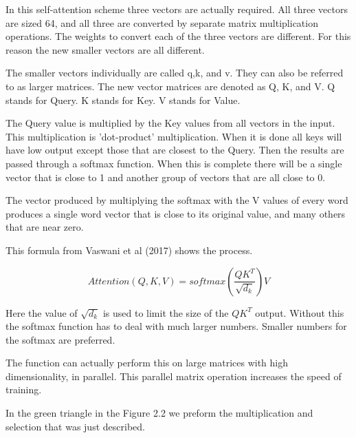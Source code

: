 In this self-attention scheme three vectors are actually required. All three vectors are sized 64, and all three are converted by separate matrix multiplication operations. The weights to convert each of the three vectors are different. For this reason the new smaller vectors are all different.

The smaller vectors individually are called q,k, and v. They can also be referred to as larger matrices. The new vector matrices are denoted as Q, K, and V. Q stands for Query. K stands for Key. V stands for Value. 

The Query value is multiplied by the Key values from all vectors in the input. This multiplication is 'dot-product' multiplication. When it is done all keys will have low output except those that are closest to the Query. Then the results are passed through a softmax function. When this is complete there will be a single vector that is close to 1 and another group of vectors that are all close to 0.

The vector produced by multiplying the softmax with the V values of every word produces a single word vector that is close to its original value, and many others that are near zero.

This formula from Vaswani et al (2017)\cite{Vaswani2017AttentionIA} 
shows the process.

$$
Attention(Q,K,V)=softmax(\dfrac{QK^T}{\sqrt{d_k}})V
$$

Here the value of $\sqrt{d_k}$ is used to limit the size of the $QK^T$ output. Without this the softmax function has to deal with much larger numbers. Smaller numbers for the softmax are preferred. 

The function can actually perform this on large matrices with high dimensionality, in parallel. This parallel matrix operation increases the speed of training.

In the green triangle in the Figure 2.2 we preform the multiplication and selection that was just described.

